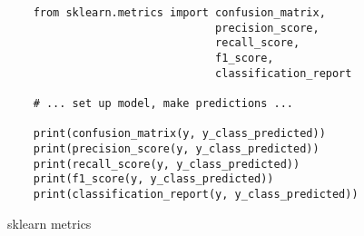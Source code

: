 \begin{code}
  \begin{verbatim}
    from sklearn.metrics import confusion_matrix, 
                                precision_score, 
                                recall_score, 
                                f1_score, 
                                classification_report

    # ... set up model, make predictions ...

    print(confusion_matrix(y, y_class_predicted))
    print(precision_score(y, y_class_predicted))
    print(recall_score(y, y_class_predicted))
    print(f1_score(y, y_class_predicted))
    print(classification_report(y, y_class_predicted))
  \end{verbatim}
  \caption{sklearn metrics}
  \label{code:sklearn_metrics}
\end{code}